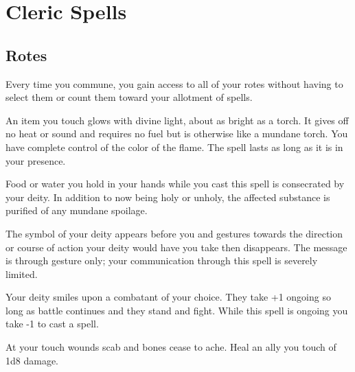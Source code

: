 \section*{Cleric Spells}
\subsection{Rotes} 

Every time you commune, you gain access to all of your rotes without having to select them or count them toward your allotment of spells.



An item you touch glows with divine light, about as bright as a torch. It gives off no heat or sound and requires no fuel but is otherwise like a mundane torch. You have complete control of the color of the flame. The spell lasts as long as it is in your presence.



Food or water you hold in your hands while you cast this spell is consecrated by your deity. In addition to now being holy or unholy, the affected substance is purified of any mundane spoilage.



The symbol of your deity appears before you and gestures towards the direction or course of action your deity would have you take then disappears. The message is through gesture only; your communication through this spell is severely limited.



Your deity smiles upon a combatant of your choice. They take +1 ongoing so long as battle continues and they stand and fight. While this spell is ongoing you take -1 to cast a spell.



At your touch wounds scab and bones cease to ache. Heal an ally you touch of 1d8 damage.


